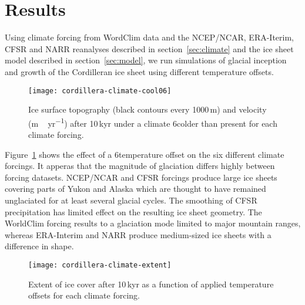 
\section{Results}
\label{sec:results}

Using climate forcing from WordClim data and the NCEP/NCAR, ERA-Iterim, CFSR and NARR reanalyses described in section~\ref{sec:climate} and the ice sheet model described in section~\ref{sec:model}, we run simulations of glacial inception and growth of the Cordilleran ice sheet using different temperature offsets.

\begin{figure}[t]
	\vspace*{2mm}
	\begin{center}
		\texttt{[image: cordillera-climate-cool06]}
	\end{center}
	\caption{Ice surface topography (black contours every 1000\,m) and velocity (\unit{m\,yr^{-1}}) after 10\,kyr under a climate 6\degC colder than present for each climate forcing.}
	\label{fig:cool06}
\end{figure}

Figure~\ref{fig:cool06} shows the effect of a 6\degC temperature offset on the six different climate forcings. It apperas that the magnitude of glaciation differs highly between forcing datasets. NCEP/NCAR and CFSR forcings produce large ice sheets covering parts of Yukon and Alaska which are thought to have remained unglaciated for at least several glacial cycles. \needref The smoothing of CFSR precipitation has limited effect on the resulting ice sheet geometry. The WorldClim forcing results to a glaciation mode limited to major mountain ranges, whereas ERA-Interim and NARR produce medium-sized ice sheets with a difference in shape.

\begin{figure}[t]
	\vspace*{2mm}
	\begin{center}
		\texttt{[image: cordillera-climate-extent]}
	\end{center}
	\caption{Extent of ice cover after 10\,kyr as a function of applied temperature offsets for each climate forcing.}
	\label{fig:extent}
\end{figure}

